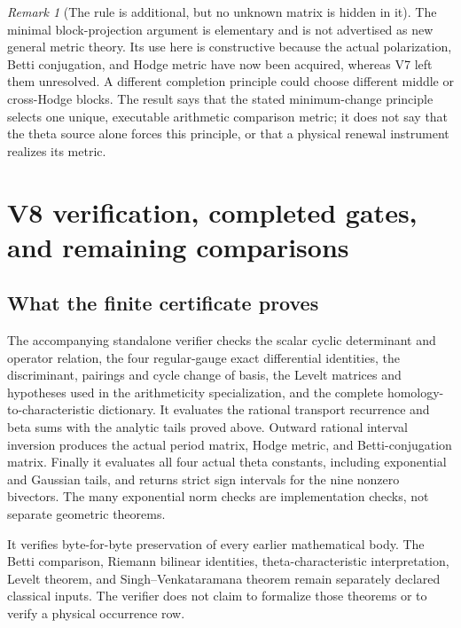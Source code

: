 \documentclass[11pt]{article}
\theoremstyle{definition}
\theoremstyle{remark}
\newtheorem{remark}[remark]{Remark}
\begin{document}
\begin{remark}[The rule is additional, but no unknown matrix is hidden in it]
The minimal block-projection argument is elementary and is not advertised as
new general metric theory. Its use here is constructive because the actual
polarization, Betti conjugation, and Hodge metric have now been acquired,
whereas V7 left them unresolved. A different completion principle could
choose different middle or cross-Hodge blocks. The result says that the
stated minimum-change principle selects one unique, executable arithmetic
comparison metric; it does not say that the theta source alone forces this
principle, or that a physical renewal instrument realizes its metric.
\end{remark}

\section{V8 verification, completed gates, and remaining comparisons}
\label{sec:v8-status}

\subsection{What the finite certificate proves}
The accompanying standalone verifier checks the scalar cyclic determinant
and operator relation, the four regular-gauge exact differential identities,
the discriminant, pairings and cycle change of basis, the Levelt matrices
and hypotheses used in the arithmeticity specialization, and the complete
homology-to-characteristic dictionary. It evaluates the rational transport
recurrence and beta sums with the analytic tails proved above. Outward
rational interval inversion produces the actual period matrix, Hodge metric,
and Betti-conjugation matrix. Finally it evaluates all four actual theta
constants, including exponential and Gaussian tails, and returns strict
sign intervals for the nine nonzero bivectors. The many exponential norm
checks are implementation checks, not separate geometric theorems.

It verifies byte-for-byte preservation of every earlier mathematical body.
The Betti comparison, Riemann bilinear identities, theta-characteristic
interpretation, Levelt theorem, and Singh--Venkataramana theorem remain
separately declared classical inputs. The verifier does not claim to
formalize those theorems or to verify a physical occurrence row.
\end{document}
